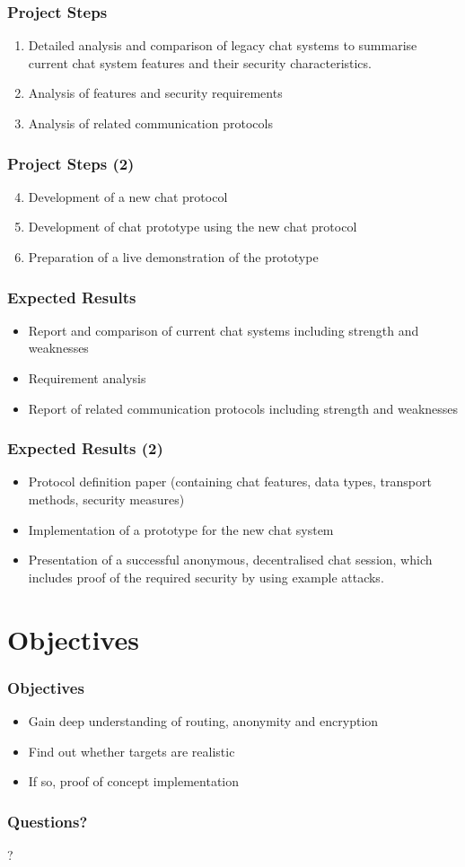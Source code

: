 \documentclass{beamer}
\begin{document}
\frame
{
  \frametitle{Project Steps}
  \begin{enumerate}
     \item Detailed analysis and comparison of legacy chat systems
        to summarise current chat system features and their
        security characteristics.
    \item Analysis of features and security requirements
    \item Analysis of related communication protocols
  \end{enumerate}
}
\frame
{
  \frametitle{Project Steps (2)}
  \begin{enumerate}
    \setcounter{enumi}{3}
    \item Development of a new chat protocol
    \item Development of chat prototype using the new chat protocol
    \item Preparation of a live demonstration of the prototype
  \end{enumerate}
}

\frame
{
  \frametitle{Expected Results}
  \begin{itemize}
    \item Report and comparison of current chat systems including strength and weaknesses
    \item Requirement analysis
    \item Report of related communication protocols including strength and weaknesses
  \end{itemize}
}
\frame
{
  \frametitle{Expected Results (2)}
  \begin{itemize}
     \item Protocol definition paper (containing chat features,
        data types, transport methods, security measures)
    \item Implementation of a prototype for the new chat system
    \item Presentation of a successful anonymous, decentralised chat session, which
       includes proof of the required security by using example attacks.
  \end{itemize}
}

\section{Objectives}
\frame
{
  \frametitle{Objectives}
  \begin{itemize}
    \item Gain deep understanding of routing, anonymity and encryption
    \item Find out whether targets are realistic
    \item If so, \pause proof of concept implementation
  \end{itemize}
}

\frame
{
  \frametitle{Questions?}
  \begin{center}
  ?
  \end{center}
}
\end{document}
